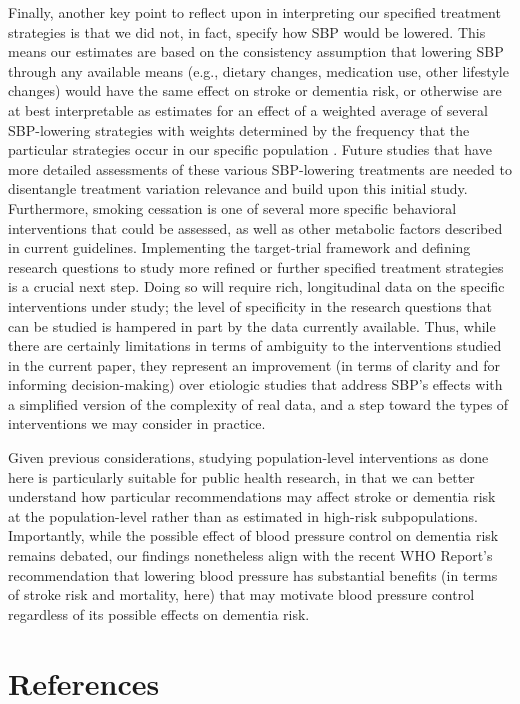 \documentclass[
]{book}
\begin{document}
Finally, another key point to reflect upon in interpreting our specified treatment strategies is that we did not, in fact, specify how SBP would be lowered. This means our estimates are based on the consistency assumption that lowering SBP through any available means (e.g., dietary changes, medication use, other lifestyle changes) would have the same effect on stroke or dementia risk, or otherwise are at best interpretable as estimates for an effect of a weighted average of several SBP-lowering strategies with weights determined by the frequency that the particular strategies occur in our specific population \autocite{waterkills,hernan2011}. Future studies that have more detailed assessments of these various SBP-lowering treatments are needed to disentangle treatment variation relevance and build upon this initial study. Furthermore, smoking cessation is one of several more specific behavioral interventions that could be assessed, as well as other metabolic factors described in current guidelines\autocite{johnson2019,lancet2020}. Implementing the target-trial framework and defining research questions to study more refined or further specified treatment strategies is a crucial next step. Doing so will require rich, longitudinal data on the specific interventions under study; the level of specificity in the research questions that can be studied is hampered in part by the data currently available. Thus, while there are certainly limitations in terms of ambiguity to the interventions studied in the current paper, they represent an improvement (in terms of clarity and for informing decision-making) over etiologic studies that address SBP's effects with a simplified version of the complexity of real data, and a step toward the types of interventions we may consider in practice.

Given previous considerations, studying population-level interventions as done here is particularly suitable for public health research, in that we can better understand how particular recommendations may affect stroke or dementia risk at the population-level rather than as estimated in high-risk subpopulations. Importantly, while the possible effect of blood pressure control on dementia risk remains debated, our findings nonetheless align with the recent WHO Report's recommendation that lowering blood pressure has substantial benefits (in terms of stroke risk and mortality, here) that may motivate blood pressure control regardless of its possible effects on dementia risk\autocite{who_dementia2019}.

\hypertarget{references-1}{%
\section{References}\label{references-1}}
\end{document}
